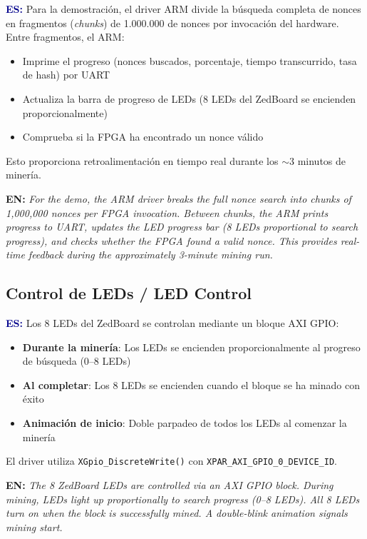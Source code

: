 \documentclass[12pt,a4paper]{article}
\newcommand{\bsubsection}[2]{%
    \subsection{#1 \textnormal{\small\color{accentblue}/ #2}}%
}
\newenvironment{bilingual}{%
    \par\medskip
}{%
    \par\medskip
}
\newcommand{\espara}[1]{\noindent\textcolor{darkblue}{\textbf{ES:}} #1\par\smallskip}
\newcommand{\enpara}[1]{\noindent\textcolor{accentblue}{\textbf{EN:}} \textit{#1}\par\smallskip}
\begin{document}
\begin{bilingual}
\espara{%
Para la demostraci\'on, el driver ARM divide la b\'usqueda completa de nonces en
fragmentos (\textit{chunks}) de 1.000.000 de nonces por invocaci\'on del hardware.
Entre fragmentos, el ARM:
\begin{itemize}[leftmargin=2em]
    \item Imprime el progreso (nonces buscados, porcentaje, tiempo transcurrido, tasa de hash) por UART
    \item Actualiza la barra de progreso de LEDs (8 LEDs del ZedBoard se encienden proporcionalmente)
    \item Comprueba si la FPGA ha encontrado un nonce v\'alido
\end{itemize}
Esto proporciona retroalimentaci\'on en tiempo real durante los $\sim$3 minutos de miner\'ia.}

\enpara{%
For the demo, the ARM driver breaks the full nonce search into chunks of
1,000,000 nonces per FPGA invocation. Between chunks, the ARM prints progress
to UART, updates the LED progress bar (8 LEDs proportional to search progress),
and checks whether the FPGA found a valid nonce. This provides real-time
feedback during the approximately 3-minute mining run.}
\end{bilingual}

\bsubsection{Control de LEDs}{LED Control}

\begin{bilingual}
\espara{%
Los 8 LEDs del ZedBoard se controlan mediante un bloque AXI GPIO:
\begin{itemize}[leftmargin=2em]
    \item \textbf{Durante la miner\'ia}: Los LEDs se encienden proporcionalmente al progreso de b\'usqueda (0--8 LEDs)
    \item \textbf{Al completar}: Los 8 LEDs se encienden cuando el bloque se ha minado con \'exito
    \item \textbf{Animaci\'on de inicio}: Doble parpadeo de todos los LEDs al comenzar la miner\'ia
\end{itemize}
El driver utiliza \texttt{XGpio\_DiscreteWrite()} con \texttt{XPAR\_AXI\_GPIO\_0\_DEVICE\_ID}.}

\enpara{%
The 8 ZedBoard LEDs are controlled via an AXI GPIO block. During mining, LEDs
light up proportionally to search progress (0--8 LEDs). All 8 LEDs turn on when
the block is successfully mined. A double-blink animation signals mining start.}
\end{bilingual}
\end{document}

